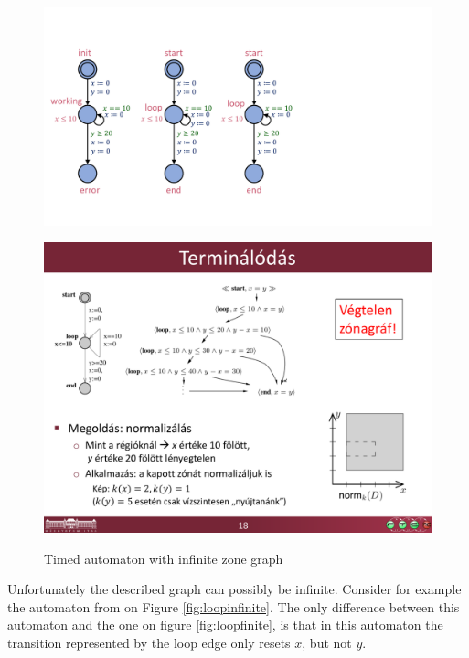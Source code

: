 \begin{figure} [b]
	\centering
	\begin{minipage}[c] {0.25\linewidth}%
		\includegraphics [width=\textwidth]{include/figures/loop_example_original}%
		\label{fig:loopinfinite}
	\end{minipage}%
	\begin{minipage}[c] {0.7\linewidth}%
		\includegraphics [width=\textwidth] {include/figures/loop_original_zonegraph}%
		\label{fig:loopinfinitegraph}
	\end{minipage}
	\caption{Timed automaton with infinite zone graph}
\end{figure} 

Unfortunately the described graph can possibly be infinite. Consider for example the automaton from \cite{bengtsson2004timed} on Figure \ref{fig:loopinfinite}. The only difference between this automaton and the one on figure \ref{fig:loopfinite}, is that in this automaton the transition represented by the loop edge only resets $x$, but not $y$.

